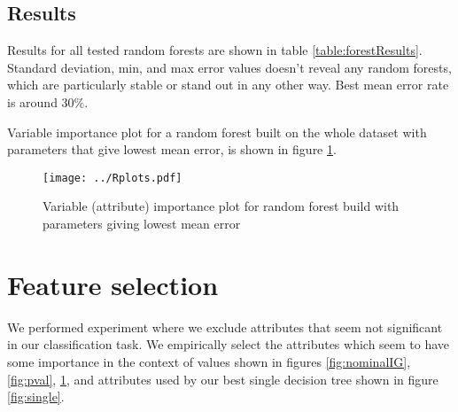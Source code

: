 \documentclass[a4paper]{article}
\begin{document}
\subsection{Results}
\label{singleConc}
Results for all tested random forests are shown in table \ref{table:forestResults}.
Standard deviation, min, and max error values doesn't reveal any random forests, which are
particularly stable or stand out in any other way.
Best mean error rate is around 30\%.

Variable importance plot for a random forest built on the whole dataset
with parameters that give lowest mean error,
is shown in figure \ref{fig:importance}.


\begin{figure}[!hbt]
    \centering
    \texttt{[image: ../Rplots.pdf]}
    \caption[]{Variable (attribute) importance plot for random forest build with parameters giving lowest mean error
    \label{fig:importance}
    }
\end{figure}


% 
% 

\section{Feature selection}
We performed experiment where we exclude attributes that
seem not significant in our classification task.
We empirically select the attributes which seem to have some importance in the context of
values shown in figures \ref{fig:nominalIG}, \ref{fig:pval}, \ref{fig:importance},
and attributes used by our best single decision tree shown in figure \ref{fig:single}.
\end{document}
